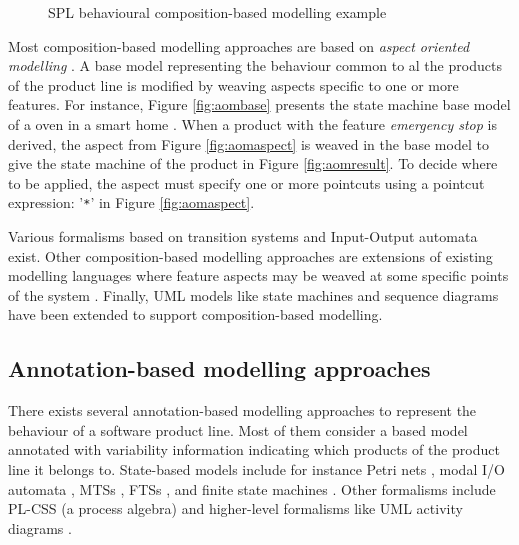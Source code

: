 \begin{figure}[t]
	\centering
	\caption{\gls{SPL} behavioural composition-based modelling example \cite{Rashid2011}}
\end{figure}

Most composition-based modelling approaches are based on \emph{aspect oriented modelling} \cite{Rashid2011,Groher2009}. A base model representing the behaviour common to al the products of the product line is modified by weaving aspects specific to one or more features. For instance, Figure \ref{fig:aombase} presents the state machine base model of a oven in a smart home \cite{Rashid2011}. When a product with the feature \textit{emergency stop} is derived, the aspect from Figure \ref{fig:aomaspect} is weaved in the base model to give the state machine of the product in Figure \ref{fig:aomresult}. To decide where to be applied, the aspect must specify one or more pointcuts using a pointcut expression: '\texttt{*}' in Figure \ref{fig:aomaspect}.

Various formalisms based on transition systems \cite{Asirelli2012,Li2002,Li2002a,Li2005,Krishnamurthi2004,Fisler2001,Cordy2012} and Input-Output automata \cite{Lauenroth2009,Lauenroth2010} exist. Other composition-based modelling approaches are extensions of existing modelling languages where feature aspects may be weaved at some specific points of the system \cite{Altisen2006,Apel2010,Batory2008,Calder2006,Gondal2011,Schaefer2010,Millo2012a,Nelson2001,Poppleton2007,Sorge2009}. Finally, UML models like state machines \cite{Shaker2012,Shaker2012a} and sequence diagrams \cite{Greenyer2012} have been extended to support composition-based modelling.


\subsection{Annotation-based modelling approaches}

There exists several annotation-based modelling approaches to represent the behaviour of a software product line. Most of them consider a based model annotated with variability information indicating which products of the product line it belongs to. State-based models include for instance Petri nets \cite{Muschevici2010,Puschel2012,Heuer2013}, modal I/O automata \cite{Larsen2007}, \glspl{MTS} \cite{Asirelli2011,Asirelli2011a,Asirelli2011b,Fantechi2008,Fischbein2006,TerBeek2013,terBeek2011}, \glspl{FTS} \cite{Classen2011-thesis,Classen2013b,Classen2011,Classen2010}, and finite state machines \cite{Sabouri2012,Sabouri2012}. Other formalisms include PL-CSS  (a process algebra) \cite{Gruler2008} and higher-level formalisms like UML activity diagrams \cite{Heuer2013}. 

